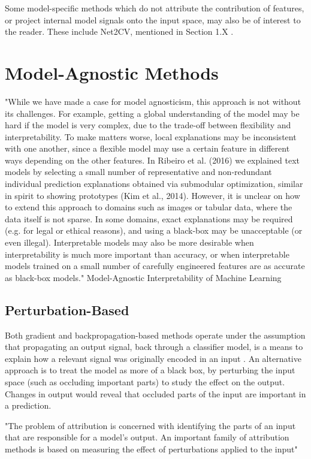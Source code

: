 \documentclass[main]{subfiles}
\begin{document}
Some model-specific methods which do not attribute the contribution of features, or project internal model signals onto the input space, may also be of interest to the reader. These include Net2CV, mentioned in Section 1.X .

\section{Model-Agnostic Methods}


"While we have made a case for model agnosticism, this
approach is not without its challenges. For example,
getting a global understanding of the model may be hard
if the model is very complex, due to the trade-off between
flexibility and interpretability. To make matters worse, local
explanations may be inconsistent with one another, since a
flexible model may use a certain feature in different ways
depending on the other features. In Ribeiro et al. (2016)
we explained text models by selecting a small number
of representative and non-redundant individual prediction
explanations obtained via submodular optimization, similar
in spirit to showing prototypes (Kim et al., 2014). However,
it is unclear on how to extend this approach to domains such
as images or tabular data, where the data itself is not sparse.
In some domains, exact explanations may be required (e.g.
for legal or ethical reasons), and using a black-box may
be unacceptable (or even illegal). Interpretable models
may also be more desirable when interpretability is much
more important than accuracy, or when interpretable models
trained on a small number of carefully engineered features
are as accurate as black-box models."  Model-Agnostic Interpretability of Machine Learning



\subsection{Perturbation-Based}
Both gradient and backpropagation-based methods operate under the assumption that propagating an output signal, back through a classifier model, is a means to explain how a relevant signal was originally encoded in an input \cite{patternnet}. An alternative approach is to treat the model as more of a black box, by perturbing the input space (such as occluding important parts) to study the effect on the output. Changes in output would reveal that occluded parts of the input are important in a prediction. 

"The problem of attribution is concerned with identifying the parts of an input that are responsible for a model's output. An important family of attribution methods is based on measuring the effect of perturbations applied to the input"
\end{document}
